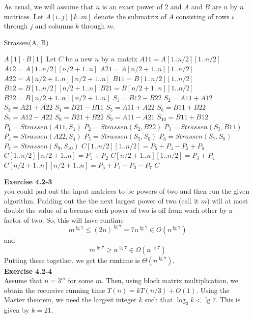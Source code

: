 \documentclass{article}
\begin{document}
As usual, we will assume that $n$ is an exact power of 2 and $A$ and $B$ are $n$ by $n$ matrices.  Let $A[i..j][k..m]$ denote the submatrix of $A$ consisting of rows $i$ through $j$ and columns $k$ through $m$. \\
\begin{algorithm}
\caption{Strassen(A, B)}
\begin{algorithmic}
	\State \Return $A[1]\cdot B[1]$
\EndIf
\State Let $C$ be a new $n$ by $n$ matrix
\State $A11 = A[1..n/2][1..n/2]$
\State $A12 = A[1..n/2][n/2+1..n]$
\State $A21 = A[n/2+1..n][1..n/2]$
\State $A22 = A[n/2+1..n][n/2+1..n]$
\State $B11 = B[1..n/2][1..n/2]$
\State $B12 = B[1..n/2][n/2+1..n]$
\State $B21 = B[n/2+1..n][1..n/2]$
\State $B22 = B[n/2+1..n][n/2+1..n]$
\State $S_1 = B12-B22$
\State $S_2 = A11+A12$
\State $S_3 = A21 + A22$
\State $S_4 = B21-B11$
\State $S_5 = A11 + A22$
\State $S_6 = B11 + B22$
\State $S_7 = A12 - A22$
\State $S_8 = B21 + B22$
\State $S_9 = A11 - A21$
\State $S_{10} = B11 + B12$
\State $P_1 = Strassen(A11, S_1)$
\State $P_2 = Strassen(S_2, B22)$
\State $P_3 = Strassen(S_3, B11)$
\State $P_4 = Strassen(A22, S_4)$
\State $P_5 = Strassen(S_5, S_6)$
\State $P_6 = Strassen(S_7, S_8)$
\State $P_7 = Strassen(S_9, S_{10})$
\State $C[1..n/2][1..n/2] = P_5 + P_4 - P_2 + P_6$
\State $C[1..n/2][n/2+1..n] = P_1 + P_2$
\State $C[n/2+1..n][1..n/2] = P_3 + P_4$
\State $C[n/2+1..n][n/2+1..n] = P_5 + P_1 - P_3 - P_7$ 
\State \Return $C$
\end{algorithmic}
\end{algorithm}


\noindent\textbf{Exercise 4.2-3}\\

you could pad out the input matrices to be powers of two and then run the given algorithm. Padding out the the next largest power of two (call it $m$) will at most double the value of n because each power of two is off from wach other by a factor of two. So, this will have runtime
\[
m^{\lg 7} \le (2n)^{\lg 7} = 7 n^{\lg 7} \in O(n^{\lg 7})
\]
and
\[
m^{\lg 7} \ge n^{\lg 7} \in \Omega(n^{\lg 7})
\]
Putting these together, we get the runtime is $\Theta(n^{\lg 7})$.\\

\noindent\textbf{Exercise 4.2-4}\\

Assume that $n = 3^m$ for some $m$.  Then, using block matrix multiplication, we obtain the recursive running time $T(n) = kT(n/3) + O(1)$.  Using the Master theorem, we need the largest integer $k$ such that $\log_3 k < \lg 7$.  This is given by $k=21$.\\
\end{document}
